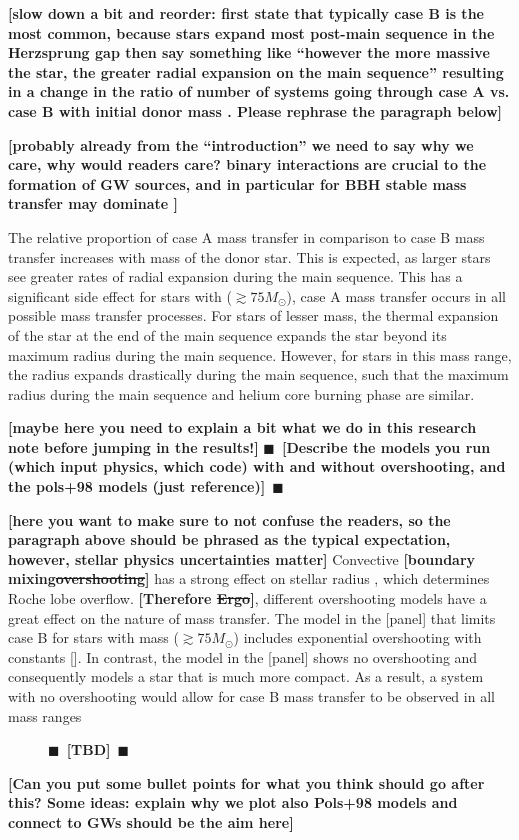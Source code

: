 \documentclass[twocolumn]{aastex63}
\newcommand{\todo}[1]{{\large $\blacksquare$~\textbf{\color{red}[#1]}}~$\blacksquare$}
\newcommand{\mr}[1]{{\textbf{\color{green!75!black}[#1]}}}
\begin{document}
\mr{slow down a bit and reorder: first state that typically case B is the most
  common, because stars expand most post-main sequence in the
  Herzsprung gap \citep{vandenheuvel:69} then say something like
  ``however the more massive the star, the greater radial expansion on
  the main sequence'' \citep[e.g.,][]{brott:11} resulting in a change in
  the ratio of number of systems going through case A vs. case B with
  initial donor mass \citep{demink:08}. Please rephrase the paragraph
  below}

\mr{probably already from the ``introduction'' we need to say why we
  care, why would readers care? binary interactions are crucial to the
formation of GW sources, and in particular for BBH stable mass
transfer may dominate \cite{marchant:21, vanson:21}}

The relative proportion of case A mass transfer in comparison to case
B mass transfer increases with mass of the donor star. This is
expected, as larger stars see greater rates of radial expansion during
the main sequence. This has a significant side effect for stars with
($\gtrsim 75M_{\odot}$), case A mass transfer occurs in all possible
mass transfer processes. For stars of lesser mass, the thermal
expansion of the star at the end of the main sequence expands the star
beyond its maximum radius during the main sequence. However, for stars
in this mass range, the radius expands drastically during the main
sequence, such that the maximum radius during the main sequence and
helium core burning phase are similar.

\mr{maybe here you need to explain a bit what we do in this research
  note before jumping in the results!}
\todo{Describe the models you run (which input physics, which code)
  with and without overshooting, and the pols+98 models (just reference)}

\mr{here you want to make sure to not confuse the readers, so the
  paragraph above should be phrased as the typical expectation,
  however, stellar physics uncertainties matter} Convective
\mr{boundary mixing\sout{overshooting}} has a strong effect on stellar
radius \cite{brott:11, johnston:24}, which determines Roche lobe
overflow. \mr{Therefore \sout{Ergo}}, different overshooting models
have a great effect on the nature of mass transfer. The model in the
[panel] that limits case B for stars with mass ($\gtrsim 75M_{\odot}$)
includes exponential overshooting with constants []. In contrast, the
model in the [panel] shows no overshooting and consequently models a
star that is much more compact. As a result, a system with no
overshooting would allow for case B mass transfer to be observed in
all mass ranges


\begin{figure*}[htbp]
  \centering
  \caption{\todo{TBD}}
  \label{fig:R_t_donor}
\end{figure*}

\mr{Can you put some bullet points for what you think should go after
  this? Some ideas: explain why we plot also Pols+98 models and
  connect to GWs should be the aim here}



\end{document}
